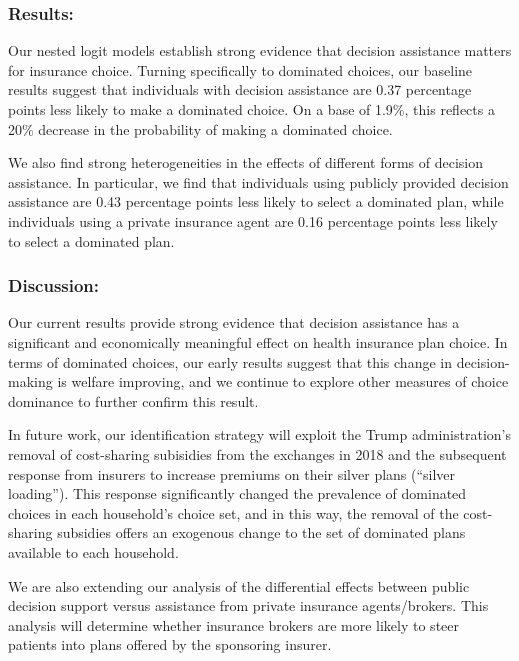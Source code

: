 \documentclass[12pt,]{article}
\begin{document}
\hypertarget{results}{%
\subsubsection{Results:}\label{results}}

Our nested logit models establish strong evidence that decision
assistance matters for insurance choice. Turning specifically to
dominated choices, our baseline results suggest that individuals with
decision assistance are 0.37 percentage points less likely to make a
dominated choice. On a base of 1.9\%, this reflects a 20\% decrease in
the probability of making a dominated choice.

We also find strong heterogeneities in the effects of different forms of
decision assistance. In particular, we find that individuals using
publicly provided decision assistance are 0.43 percentage points less
likely to select a dominated plan, while individuals using a private
insurance agent are 0.16 percentage points less likely to select a
dominated plan.

\hypertarget{discussion}{%
\subsubsection{Discussion:}\label{discussion}}

Our current results provide strong evidence that decision assistance has
a significant and economically meaningful effect on health insurance
plan choice. In terms of dominated choices, our early results suggest
that this change in decision-making is welfare improving, and we
continue to explore other measures of choice dominance to further
confirm this result.

In future work, our identification strategy will exploit the Trump
administration's removal of cost-sharing subisidies from the exchanges
in 2018 and the subsequent response from insurers to increase premiums
on their silver plans (``silver loading''). This response significantly
changed the prevalence of dominated choices in each household's choice
set, and in this way, the removal of the cost-sharing subsidies offers
an exogenous change to the set of dominated plans available to each
household.

We are also extending our analysis of the differential effects between
public decision support versus assistance from private insurance
agents/brokers. This analysis will determine whether insurance brokers
are more likely to steer patients into plans offered by the sponsoring
insurer.
\end{document}
